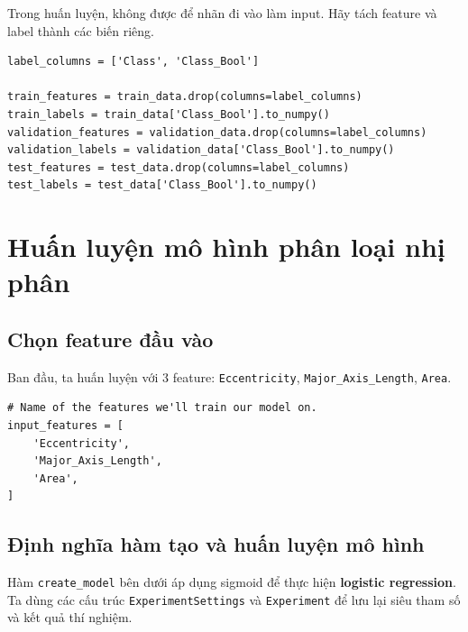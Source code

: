 \documentclass[12pt,a4paper]{article}
\begin{document}
\begin{luuy}[title={Tránh rò rỉ nhãn (label leakage)}]
Trong huấn luyện, không được để nhãn đi vào làm input.
Hãy tách feature và label thành các biến riêng.
\end{luuy}

\begin{lstlisting}
label_columns = ['Class', 'Class_Bool']

train_features = train_data.drop(columns=label_columns)
train_labels = train_data['Class_Bool'].to_numpy()
validation_features = validation_data.drop(columns=label_columns)
validation_labels = validation_data['Class_Bool'].to_numpy()
test_features = test_data.drop(columns=label_columns)
test_labels = test_data['Class_Bool'].to_numpy()
\end{lstlisting}

\newpage

\section{Huấn luyện mô hình phân loại nhị phân}

\subsection{Chọn feature đầu vào}

\begin{phuongphap}[title={Bắt đầu với 3 feature}]
Ban đầu, ta huấn luyện với 3 feature: \texttt{Eccentricity}, \texttt{Major\_Axis\_Length}, \texttt{Area}.
\end{phuongphap}

\begin{lstlisting}
# Name of the features we'll train our model on.
input_features = [
    'Eccentricity',
    'Major_Axis_Length',
    'Area',
]
\end{lstlisting}

\subsection{Định nghĩa hàm tạo và huấn luyện mô hình}

\begin{ynghia}[title={Ghi chú}]
Hàm \texttt{create\_model} bên dưới áp dụng sigmoid để thực hiện \textbf{logistic regression}.
Ta dùng các cấu trúc \texttt{ExperimentSettings} và \texttt{Experiment} để lưu lại siêu tham số và kết quả thí nghiệm.
\end{ynghia}
\end{document}
